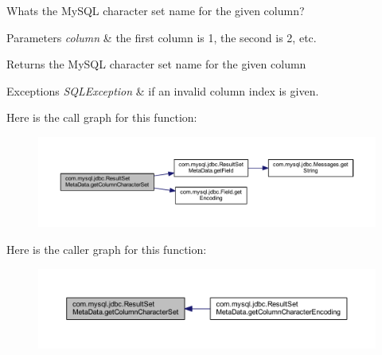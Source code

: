 What\textquotesingle{}s the My\+S\+QL character set name for the given column?


\begin{DoxyParams}{Parameters}
{\em column} & the first column is 1, the second is 2, etc.\\
\hline
\end{DoxyParams}
\begin{DoxyReturn}{Returns}
the My\+S\+QL character set name for the given column
\end{DoxyReturn}

\begin{DoxyExceptions}{Exceptions}
{\em S\+Q\+L\+Exception} & if an invalid column index is given. \\
\hline
\end{DoxyExceptions}
Here is the call graph for this function\+:
\nopagebreak
\begin{figure}[H]
\begin{center}
\leavevmode
\includegraphics[width=350pt]{classcom_1_1mysql_1_1jdbc_1_1_result_set_meta_data_acaf0893c65c1ddcbf1fffdec5a2c011a_cgraph}
\end{center}
\end{figure}
Here is the caller graph for this function\+:
\nopagebreak
\begin{figure}[H]
\begin{center}
\leavevmode
\includegraphics[width=350pt]{classcom_1_1mysql_1_1jdbc_1_1_result_set_meta_data_acaf0893c65c1ddcbf1fffdec5a2c011a_icgraph}
\end{center}
\end{figure}
\mbox{\label{classcom_1_1mysql_1_1jdbc_1_1_result_set_meta_data_af666c44dbef9b1dd62cdd4710807f34d}} 

